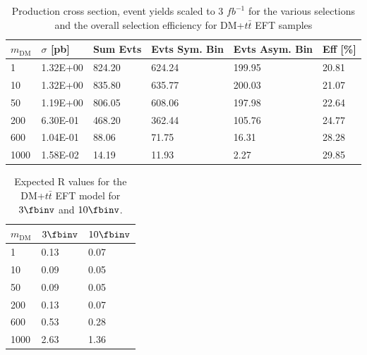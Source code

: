 \begin{table}[h]
\centering
\begin{tabular}{llllll}
\hline
$m_{\textrm{DM}}$             & $\sigma$ [pb] & Sum Evts       & Evts Sym. Bin & Evts Asym. Bin & Eff  [\%]   \\\hline
1    & 1.32E+00 & 824.20 & 624.24 & 199.95 & 20.81 \\
10   & 1.32E+00 & 835.80 & 635.77 & 200.03 & 21.07 \\
50   & 1.19E+00 & 806.05 & 608.06 & 197.98 & 22.64 \\
200  & 6.30E-01 & 468.20 & 362.44 & 105.76 & 24.77 \\
600  & 1.04E-01 & 88.06  & 71.75  & 16.31  & 28.28 \\
1000 & 1.58E-02 & 14.19  & 11.93  & 2.27   & 29.85\\
\hline
\end{tabular}
\caption{Production cross section, event yields scaled to 3 $fb^{-1 }$ for the various selections and the overall selection efficiency for DM+$t\bar{t}$ EFT samples}
\label{tab:dm_dmtt_EFT_g1}
\end{table}


\begin{table}[h]
\centering
\begin{tabular}{lll}\hline
$m_{\textrm{DM}}$& $3\fbinv$  & $10\fbinv$ \\\hline
1            & 0.13 & 0.07 \\
10           & 0.09 & 0.05 \\
50           & 0.09 & 0.05 \\
200          & 0.13 & 0.07 \\
600          & 0.53 & 0.28 \\
1000         & 2.63 & 1.36 \\
\hline
\end{tabular}
\caption{Expected R values for the DM+$t\bar{t}$ EFT model for $3\fbinv$ and $10\fbinv$.} 
\label{tab:dm_dmtt_eft_rvalues}
\end{table}


